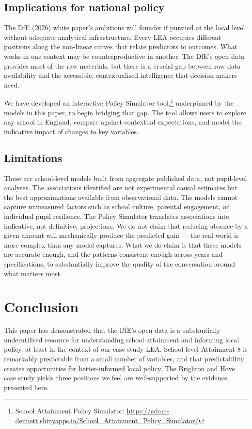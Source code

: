 \documentclass[
  12pt,
  titlepage]{article}
\begin{document}
\subsection{Implications for national
policy}\label{implications-for-national-policy}

The DfE (2026) white paper's ambitions will founder if pursued at the
local level without adequate analytical infrastructure. Every LEA
occupies different positions along the non-linear curves that relate
predictors to outcomes. What works in one context may be
counterproductive in another. The DfE's open data provides most of the
raw materials, but there is a crucial gap between raw data availability
and the accessible, contextualised intelligence that decision makers
need.

We have developed an interactive Policy Simulator tool,\footnote{School
  Attainment Policy Simulator:
  \url{https://adam-dennett.shinyapps.io/School_Attainment_Policy_Simulator/}}
underpinned by the models in this paper, to begin bridging that gap. The
tool allows users to explore any school in England, compare against
contextual expectations, and model the indicative impact of changes to
key variables.

\subsection{Limitations}\label{limitations}

These are school-level models built from aggregate published data, not
pupil-level analyses. The associations identified are not experimental
causal estimates but the best approximations available from
observational data. The models cannot capture unmeasured factors such as
school culture, parental engagement, or individual pupil resilience. The
Policy Simulator translates associations into indicative, not
definitive, projections. We do not claim that reducing absence by a
given amount will mechanically produce the predicted gain --- the real
world is more complex than any model captures. What we do claim is that
these models are accurate enough, and the patterns consistent enough
across years and specifications, to substantially improve the quality of
the conversation around what matters most.

\section{Conclusion}\label{conclusion}

This paper has demonstrated that the DfE's open data is a substantially
underutilised resource for understanding school attainment and informing
local policy, at least in the context of our case study LEA.
School-level Attainment 8 is remarkably predictable from a small number
of variables, and that predictability creates opportunities for
better-informed local policy. The Brighton and Hove case study yields
three positions we feel are well-supported by the evidence presented
here.
\end{document}
